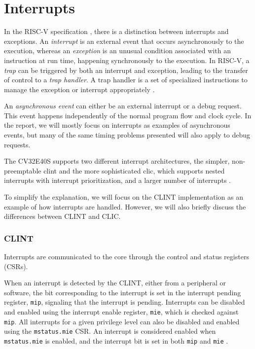 \section{Interrupts}
\label{sec:bg_interrupts}

In the RISC-V specification \cite{watermanRISCVInstructionSet2021}, there is a distinction between interrupts and exceptions. An \textit{interrupt} is an external event that occurs asynchronously to the execution, whereas an \textit{exception} is an unusual condition associated with an instruction at run time, happening synchronously to the execution. In RISC-V, a \textit{trap} can be triggered by both an interrupt and exception, leading to the transfer of control to a \textit{trap handler}. A trap handler is a set of specialized instructions to manage the exception or interrupt appropriately \cite{watermanRISCVInstructionSet2021}. 

An \textit{asynchronous event} can either be an external interrupt or a debug request. This event happens independently of the normal program flow and clock cycle. In the report, we will mostly focus on interrupts as examples of asynchronous events, but many of the same timing problems presented will also apply to debug requests.


The CV32E40S supports two different interrupt architectures, the simpler, non-preemptable \acrfull{clint} and the more sophisticated \acrfull{clic}, which supports nested interrupts with interrupt prioritization, and a larger number of interrupts \cite{openhwgroupExceptionsInterruptsCOREV2023}. 


To simplify the explanation, we will focus on the CLINT implementation as an example of how interrupts are handled. However, we will also briefly discuss the differences between CLINT and CLIC. 

\subsubsection{CLINT}
Interrupts are communicated to the core through the control and status registers (CSRs).

When an interrupt is detected by the CLINT, either from a peripheral or software, the bit corresponding to the interrupt is set in the interrupt pending register, \lstinline{mip}, signaling that the interrupt is pending.
Interrupts can be disabled and enabled using the interrupt enable register, \lstinline{mie}, which is checked against \lstinline{mip}. All interrupts for a given privilege level can also be disabled and enabled using the \lstinline{mstatus.mie} CSR. An interrupt is considered enabled when \lstinline{mstatus.mie} is enabled, and the interrupt bit is set in both \lstinline{mip} and \lstinline{mie} \cite{watermanRISCVInstructionSet2021}.

